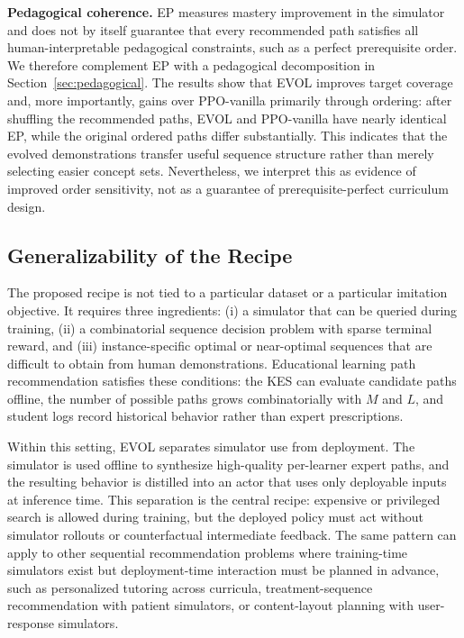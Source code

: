 \documentclass[sigconf,anonymous]{acmart}
\newcommand{\ours}{\textrm{EVOL}}
\begin{document}
\textbf{Pedagogical coherence.}
EP measures mastery improvement in the simulator and does not by itself guarantee that every recommended path satisfies all human-interpretable pedagogical constraints, such as a perfect prerequisite order. We therefore complement EP with a pedagogical decomposition in Section~\ref{sec:pedagogical}. The results show that \ours{} improves target coverage and, more importantly, gains over PPO-vanilla primarily through ordering: after shuffling the recommended paths, \ours{} and PPO-vanilla have nearly identical EP, while the original ordered paths differ substantially. This indicates that the evolved demonstrations transfer useful sequence structure rather than merely selecting easier concept sets. Nevertheless, we interpret this as evidence of improved order sensitivity, not as a guarantee of prerequisite-perfect curriculum design.

\subsection{Generalizability of the Recipe}

The proposed recipe is not tied to a particular dataset or a particular imitation objective. It requires three ingredients: (i) a simulator that can be queried during training, (ii) a combinatorial sequence decision problem with sparse terminal reward, and (iii) instance-specific optimal or near-optimal sequences that are difficult to obtain from human demonstrations. Educational learning path recommendation satisfies these conditions: the KES can evaluate candidate paths offline, the number of possible paths grows combinatorially with $M$ and $L$, and student logs record historical behavior rather than expert prescriptions.

Within this setting, \ours{} separates simulator use from deployment. The simulator is used offline to synthesize high-quality per-learner expert paths, and the resulting behavior is distilled into an actor that uses only deployable inputs at inference time. This separation is the central recipe: expensive or privileged search is allowed during training, but the deployed policy must act without simulator rollouts or counterfactual intermediate feedback. The same pattern can apply to other sequential recommendation problems where training-time simulators exist but deployment-time interaction must be planned in advance, such as personalized tutoring across curricula, treatment-sequence recommendation with patient simulators, or content-layout planning with user-response simulators.
\end{document}

